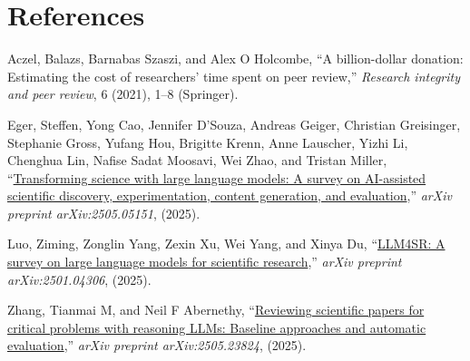 \documentclass[
  11pt,
  letterpaper,
  DIV=11,
  numbers=noendperiod]{scrreprt}
\newlength{\cslhangindent}
\newenvironment{CSLReferences}[2] %
 {\begin{list}{}{%
  \setlength{\itemindent}{0pt}
  \setlength{\leftmargin}{0pt}
  \setlength{\parsep}{0pt}
  \ifodd #1
   \setlength{\leftmargin}{\cslhangindent}
   \setlength{\itemindent}{-1\cslhangindent}
  \fi
  \setlength{\itemsep}{#2\baselineskip}}}
 {\end{list}}
\begin{document}

\chapter*{References}\label{references}


\label{refs}
\begin{CSLReferences}{1}{0}
Aczel, Balazs, Barnabas Szaszi, and Alex O Holcombe, {``A billion-dollar
donation: Estimating the cost of researchers' time spent on peer
review,''} \emph{Research integrity and peer review}, 6 (2021), 1--8
(Springer).

Eger, Steffen, Yong Cao, Jennifer D'Souza, Andreas Geiger, Christian
Greisinger, Stephanie Gross, Yufang Hou, Brigitte Krenn, Anne Lauscher,
Yizhi Li, Chenghua Lin, Nafise Sadat Moosavi, Wei Zhao, and Tristan
Miller, {``\href{https://arxiv.org/abs/2502.05151}{Transforming science
with large language models: A survey on AI-assisted scientific
discovery, experimentation, content generation, and evaluation},''}
\emph{arXiv preprint arXiv:2505.05151}, (2025).

Luo, Ziming, Zonglin Yang, Zexin Xu, Wei Yang, and Xinya Du,
{``\href{https://arxiv.org/abs/2501.04306}{LLM4SR: A survey on large
language models for scientific research},''} \emph{arXiv preprint
arXiv:2501.04306}, (2025).

Zhang, Tianmai M, and Neil F Abernethy,
{``\href{https://arxiv.org/abs/2505.23824v2}{Reviewing scientific papers
for critical problems with reasoning LLMs: Baseline approaches and
automatic evaluation},''} \emph{arXiv preprint arXiv:2505.23824},
(2025).

\end{CSLReferences}
\end{document}
